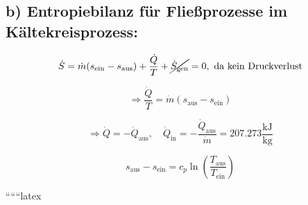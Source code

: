 \subsection*{b) Entropiebilanz für Fließprozesse im Kältekreisprozess:}

\[
\dot{S} = \dot{m} (s_{\text{ein}} - s_{\text{aus}}) + \frac{\dot{Q}}{T} + \cancel{\dot{S}_{\text{gen}}} = 0, \text{ da kein Druckverlust}
\]

\[
\Rightarrow \frac{\dot{Q}}{T} = \dot{m} (s_{\text{aus}} - s_{\text{ein}})
\]

\[
\Rightarrow \dot{Q} = -\dot{Q}_{\text{aus}}, \quad \dot{Q}_{\text{in}} = -\frac{\dot{Q}_{\text{aus}}}{\dot{m}} = 207.273 \frac{\text{kJ}}{\text{kg}}
\]

\[
s_{\text{aus}} - s_{\text{ein}} = c_p \ln \left( \frac{T_{\text{aus}}}{T_{\text{ein}}} \right)
\]

``````latex